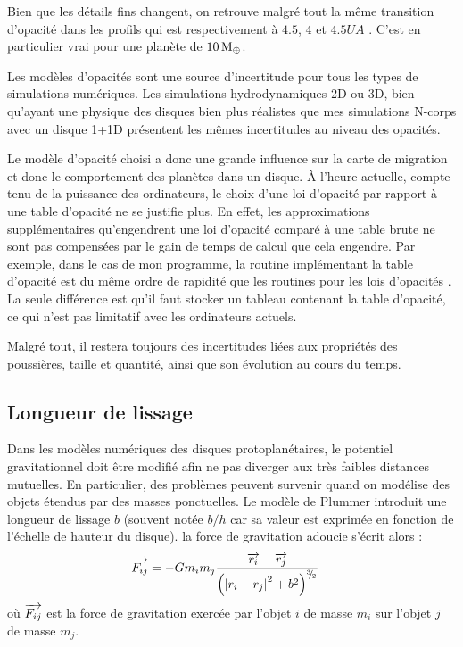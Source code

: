 Bien que les détails fins changent, on retrouve malgré tout la même transition d'opacité dans les profils \citep{bell1994FU, zhu2009nonsteady, hure2000transition} qui est respectivement à $4.5$, $4$ et $4.5\unit{UA}$ . C'est en particulier vrai pour une planète de $10\mathrm{\thinspace M_\oplus}$.

\bigskip

Les modèles d'opacités sont une source d'incertitude pour tous les types de simulations numériques. Les simulations hydrodynamiques 2D ou 3D, bien qu'ayant une physique des disques bien plus réalistes que mes simulations N-corps avec un disque 1+1D présentent les mêmes incertitudes au niveau des opacités.

Le modèle d'opacité choisi a donc une grande influence sur la carte de migration et donc le comportement des planètes dans un
disque. À l'heure actuelle, compte tenu de la puissance des ordinateurs, le choix d'une loi d'opacité par rapport à une table
d'opacité ne se justifie plus. En effet, les approximations supplémentaires qu'engendrent une loi d'opacité comparé
à une table brute ne sont pas compensées par le gain de temps de calcul que cela engendre. Par exemple, dans le cas de mon programme, la routine
implémentant la table d'opacité \cite{hure2000transition} est du même ordre de rapidité que les routines pour les lois d'opacités \citep{bell1994FU, zhu2009nonsteady, chambers2009analytic}. La seule différence est qu'il
faut stocker un tableau contenant la table d'opacité, ce qui n'est pas limitatif avec les ordinateurs actuels.

Malgré tout, il restera toujours des incertitudes liées aux propriétés des poussières, taille et quantité, ainsi que son évolution
au cours du temps. 

\subsection{Longueur de lissage}\label{sec:smoothing_effect}
Dans les modèles numériques des disques protoplanétaires, le potentiel gravitationnel doit être modifié afin ne pas diverger aux
très faibles distances mutuelles. En particulier, des problèmes peuvent survenir quand on modélise des objets étendus par des
masses ponctuelles. Le modèle de Plummer introduit une longueur de lissage $b$ (souvent notée $b/h$ car sa valeur est exprimée
en fonction de l'échelle de hauteur du disque). la force de gravitation adoucie s'écrit alors : 
\begin{align}
{\overrightarrow{F_{ij}}} &= -G m_i m_j \frac{{\overrightarrow{r_i}} - {\overrightarrow{r_j}}}{\left(\left|r_i - r_j\right|^2 + b^2\right)^{{}^{3\!\!}/ _{\!2}}}
\end{align}
où ${\overrightarrow{F_{ij}}}$ est la force de gravitation exercée par l'objet $i$ de masse $m_i$ sur l'objet $j$ de masse $m_j$.


